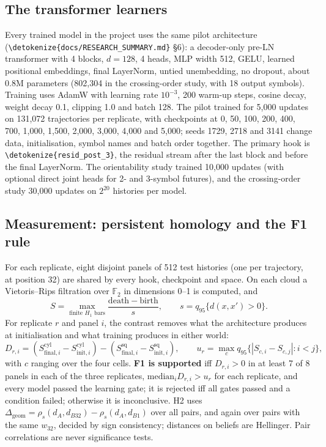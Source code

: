 \documentclass[11pt,a4paper]{article}
\newcommand{\dgeom}{\Delta_{\mathrm{geom}}}
\DeclareRobustCommand{\_}{\ifmmode\origunderscore\else\textunderscore\allowbreak\fi}
\DeclareRobustCommand{\fpath}[1]{\begingroup\small\expandafter\nolinkurl\expandafter{\detokenize{#1}}\endgroup}
\begin{document}
\subsection{The transformer learners}
Every trained model in the project uses the same pilot architecture
(\fpath{docs/RESEARCH_SUMMARY.md} \S6): a decoder-only pre-LN transformer \citep{vaswani2017attention,xiong2020layer}
with 4 blocks, $d=128$, 4 heads, MLP width 512, GELU, learned positional embeddings, final
LayerNorm, untied unembedding, no dropout, about 0.8M parameters (802,304 in the crossing-order
study, with 18 output symbols). Training uses AdamW \citep{loshchilov2019adamw} with learning rate $10^{-3}$, 200 warm-up
steps, cosine decay, weight decay 0.1, clipping 1.0 and batch 128. The pilot trained for 5,000
updates on 131,072 trajectories per replicate, with checkpoints at 0, 50, 100, 200, 400, 700,
1,000, 1,500, 2,000, 3,000, 4,000 and 5,000; seeds 1729, 2718 and 3141 change data,
initialisation, symbol names and batch order together. The primary hook is \fpath{resid_post_3},
the residual stream after the last block and before the final LayerNorm. The orientability
study trained 10,000 updates (with optional direct joint heads for 2- and 3-symbol futures), and
the crossing-order study 30,000 updates on $2^{20}$ histories per model.

\subsection{Measurement: persistent homology and the F1 rule}
For each replicate, eight disjoint panels of 512 test histories (one per trajectory, at position
32) are shared by every hook, checkpoint and space. On each cloud a Vietoris--Rips filtration
over $\mathbb{F}_2$ in dimensions 0--1 is computed, and
\begin{equation}
S=\max_{\text{finite }H_1\text{ bars}}\frac{\mathrm{death}-\mathrm{birth}}{s},\qquad s=q_{95}\{d(x,x')>0\}.
\end{equation}
For replicate $r$ and panel $i$, the contrast removes what the architecture produces at
initialisation and what training produces in either world:
\begin{equation}
D_{r,i}=(S^{\mathrm{cyl}}_{\mathrm{final},i}-S^{\mathrm{cyl}}_{\mathrm{init},i})-(S^{\mathrm{sq}}_{\mathrm{final},i}-S^{\mathrm{sq}}_{\mathrm{init},i}),
\qquad u_r=\max_c q_{95}\{|S_{c,i}-S_{c,j}|:i<j\},
\end{equation}
with $c$ ranging over the four cells. \textbf{F1 is supported} iff $D_{r,i}>0$ in at least 7 of 8
panels in each of the three replicates, $\mathrm{median}_iD_{r,i}>u_r$ for each replicate, and
every model passed the learning gate; it is rejected iff all gates passed and a condition failed;
otherwise it is inconclusive. H2 uses
$\dgeom=\rho_s(d_A,d_{B32})-\rho_s(d_A,d_{B1})$ over all pairs, and again over pairs with the same
$w_{32}$, decided by sign consistency; distances on beliefs are Hellinger. Pair correlations are
never significance tests.
\end{document}
